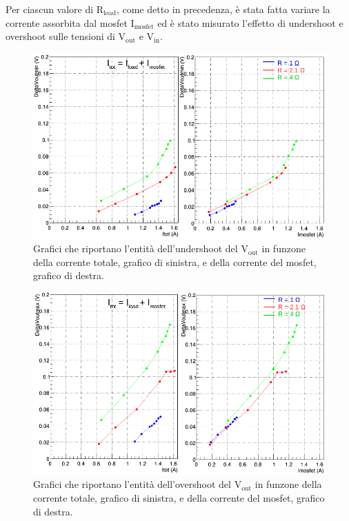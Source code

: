 Per ciascun valore di $\mathrm{R_{load}}$, come detto in precedenza, è stata fatta variare la corrente assorbita dal mosfet $\mathrm{I_{mosfet}}$ ed è stato misurato l'effetto di undershoot e overshoot sulle tensioni di $\mathrm{V_{out}}$ e $\mathrm{V_{in}}$.
\begin{figure}
\centering
\includegraphics[scale=.44]{Immagini/VoutUnd}
\caption{Grafici che riportano l'entità dell'undershoot del $\mathrm{V_{out}}$ in funzone della corrente totale, grafico di sinistra, e della corrente del mosfet, grafico di destra.}
\label{VoutUnd}
\end{figure}
\begin{figure}
\centering
\includegraphics[scale=.44]{Immagini/VoutOver}
\caption{Grafici che riportano l'entità dell'overshoot del $\mathrm{V_{out}}$ in funzone della corrente totale, grafico di sinistra, e della corrente del mosfet, grafico di destra.}
\label{VoutOver}
\end{figure}
